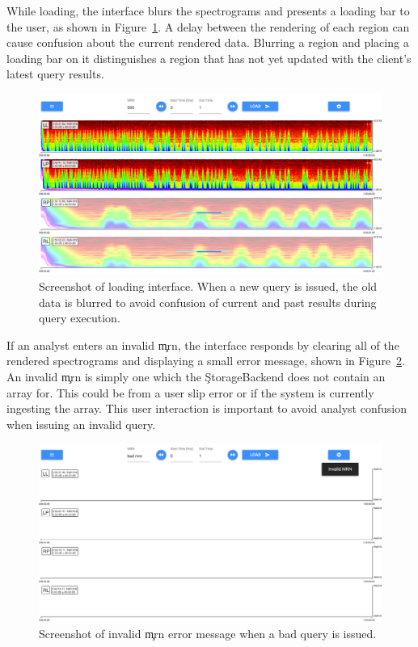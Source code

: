 While loading, the interface blurs the spectrograms and presents a loading bar
to the user, as shown in Figure~\ref{fig:loading}. A delay between the
rendering of each region can cause confusion about the current rendered data.
Blurring a region and placing a loading bar on it distinguishes a region that
has not yet updated with the client's latest query results. \\

\begin{figure}[h]
\begin{center}
\includegraphics[scale=0.35]{./img/loading.png}
\caption{Screenshot of loading interface. When a new query is issued, the old
  data is blurred to avoid confusion of current and past results during query
  execution.}
\label{fig:loading}
\end{center}
\end{figure}

If an analyst enters an invalid \c{mrn}, the interface responds by clearing all
of the rendered spectrograms and displaying a small error message, shown in
Figure~\ref{fig:error}. An invalid \c{mrn} is simply one which the
\c{StorageBackend} does not contain an array for. This could be from a user slip
error or if the system is currently ingesting the array. This user interaction
is important to avoid analyst confusion when issuing an invalid query. \\

\begin{figure}[h]
\begin{center}
\includegraphics[scale=0.35]{./img/error.png}
\caption{Screenshot of invalid \c{mrn} error message when a bad query is
  issued.}
\label{fig:error}
\end{center}
\end{figure}

